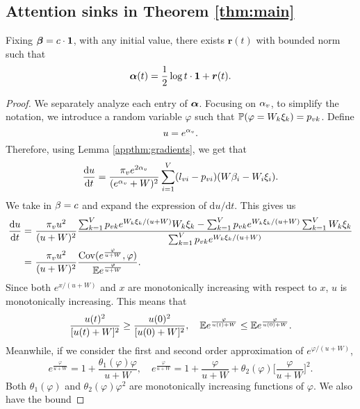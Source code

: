 \subsection{Attention sinks in Theorem \ref{thm:main}}
\begin{theorem}\label{appthm:main-2}
Fixing $\boldsymbol{\beta}= c \cdot \bm{1}$, with any initial value, there exists $\bm{r}(t)$ with bounded norm such that
\[\bm{\alpha}(t) = \frac{1}{2} \log t \cdot \bm{1} + \bm{r}(t).\]
\end{theorem}
\begin{proof}
We separately analyze each entry of $\bm{\alpha}$. Focusing on $\alpha_v$, to simplify the notation, we introduce a random variable $\varphi$ such that $\mathbb{P}(\varphi=W_k\xi_k)=p_{vk}$.
Define 
\[
u = e^{\alpha_v}.
\]
Therefore, using Lemma \ref{appthm:gradients}, we get that
\begin{align*}
\frac{\mathrm{d} u}{\mathrm{d} t} = \frac{\pi_v e^{2\alpha_v}}{(e^{\alpha_v}+W)^2} 
\sum_{i=1}^V({l}_{vi}-{p}_{vi})(W\beta_i-W_i\xi_i).
\end{align*}
We take in $\beta = c$ and expand the expression of $\mathrm{d}u/\mathrm{d}t$. This gives us
\begin{align*}
\frac{\mathrm{d} u}{\mathrm{d} t} = &~ \frac{\pi_v u^2}{(u+W)^2} \frac{\sum_{k=1}^V p_{vk} e^{W_k\xi_k/(u+W)}W_k\xi_k - \sum_{k=1}^V p_{vk} e^{W_k\xi_k/(u+W)}\sum_{k=1}^V W_k\xi_k}{\sum_{k=1}^V p_{vk} e^{W_k\xi_k/(u+W)}}\\
= &~ \frac{\pi_v u^2}{(u+W)^2} \frac{\mathrm{Cov}(e^{\frac{\varphi}{u+W}},\varphi)}{\mathbb{E} e^{\frac{\varphi}{u+W}}}.
\end{align*}
Since both $e^{x/(u+W)}$ and $x$ are monotonically increasing with respect to $x$, $u$ is monotonically increasing. This means that
\[
\frac{u(t)^2}{[u(t)+W]^2} \geq \frac{u(0)^2}{[u(0)+W]^2},\quad \mathbb{E} e^{\frac{\varphi}{u(t)+W}} \leq \mathbb{E} e^{\frac{\varphi}{u(0)+W}}.
\]
Meanwhile, if we consider the first and second order approximation of $e^{\varphi/(u+W)}$, 
\[
e^{\frac{\varphi}{u+W}} = 1 + \frac{\theta_1(\varphi) \varphi}{u+W},\quad e^{\frac{\varphi}{u+W}} = 1 + \frac{\varphi}{u+W} + \theta_2(\varphi) \Big[\frac{\varphi}{u+W}\Big]^2.
\]
Both $\theta_1(\varphi)$ and $\theta_2(\varphi)\varphi^2$ are  monotonically increasing functions of $\varphi$. We also have the bound

\end{proof}
